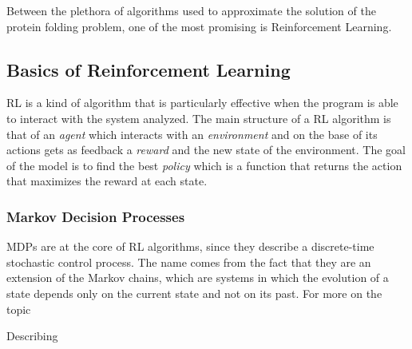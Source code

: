 Between the plethora of algorithms used to approximate the solution of the protein folding problem, one of the most promising is Reinforcement Learning.

\subsection{Basics of Reinforcement Learning}

RL is a kind of algorithm that is particularly effective when the program is able to interact with the system analyzed.
The main structure of a RL algorithm is that of an \emph{agent} which interacts with an \emph{environment} and on the base of its actions gets as feedback a \emph{reward} and the new state of the environment.
The goal of the model is to find the best \emph{policy} which is a function that returns the action that maximizes the reward at each state.


\subsubsection{Markov Decision Processes}

MDPs are at the core of RL algorithms, since they describe a discrete-time stochastic control process.
The name comes from the fact that they are an extension of the Markov chains, which are systems in which the evolution of a state depends only on the current state and not on its past.
For more on the topic 

Describing 
